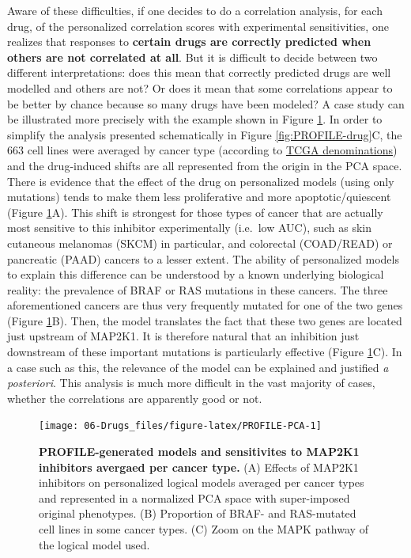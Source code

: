 \documentclass[a4paper,12pt,twoside,onecolumn,openright,final,oldfontcommands]{memoir}
\begin{document}
Aware of these difficulties, if one decides to do a correlation
analysis, for each drug, of the personalized correlation scores with
experimental sensitivities, one realizes that responses to
\textbf{certain drugs are correctly predicted when others are not
correlated at all}. But it is difficult to decide between two different
interpretations: does this mean that correctly predicted drugs are well
modelled and others are not? Or does it mean that some correlations
appear to be better by chance because so many drugs have been modeled? A
case study can be illustrated more precisely with the example shown in
Figure \ref{fig:PROFILE-PCA}. In order to simplify the analysis
presented schematically in Figure \ref{fig:PROFILE-drug}C, the 663 cell
lines were averaged by cancer type (according to
\href{https://gdc.cancer.gov/resources-tcga-users/tcga-code-tables/tcga-study-abbreviations}{TCGA
denominations}) and the drug-induced shifts are all represented from the
origin in the PCA space. There is evidence that the effect of the drug
on personalized models (using only mutations) tends to make them less
proliferative and more apoptotic/quiescent (Figure
\ref{fig:PROFILE-PCA}A). This shift is strongest for those types of
cancer that are actually most sensitive to this inhibitor experimentally
(i.e.~low AUC), such as skin cutaneous melanomas (SKCM) in particular,
and colorectal (COAD/READ) or pancreatic (PAAD) cancers to a lesser
extent. The ability of personalized models to explain this difference
can be understood by a known underlying biological reality: the
prevalence of BRAF or RAS mutations in these cancers. The three
aforementioned cancers are thus very frequently mutated for one of the
two genes (Figure \ref{fig:PROFILE-PCA}B). Then, the model translates
the fact that these two genes are located just upstream of MAP2K1. It is
therefore natural that an inhibition just downstream of these important
mutations is particularly effective (Figure \ref{fig:PROFILE-PCA}C). In
a case such as this, the relevance of the model can be explained and
justified \emph{a posteriori}. This analysis is much more difficult in
the vast majority of cases, whether the correlations are apparently good
or not.

\begin{figure}

{\centering \texttt{[image: 06-Drugs\_files/figure-latex/PROFILE-PCA-1]} 

}

\caption[PROFILE-generated models and sensitivites to MAP2K1  inhibitors avergaed per cancer type]{\textbf{PROFILE-generated models and
sensitivites to MAP2K1 inhibitors avergaed per cancer type.} (A) Effects
of MAP2K1 inhibitors on personalized logical models averaged per cancer
types and represented in a normalized PCA space with super-imposed
original phenotypes. (B) Proportion of BRAF- and RAS-mutated cell lines
in some cancer types. (C) Zoom on the MAPK pathway of the logical model
used.}\label{fig:PROFILE-PCA}
\end{figure}
\end{document}
